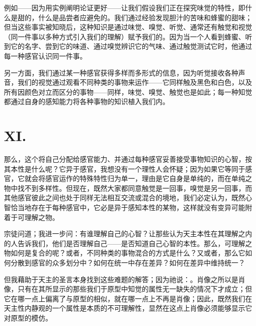 例如——因为用实例阐明论证更好——让我们假设我们正在探究味觉的特性，即什么是甜的，什么是品尝者应避免的。我们通过经验发现胆汁的苦味和蜂蜜的甜味；但当这些事实被知晓后，这种知识是通过味觉、嗅觉、听觉、通常还有触觉和视觉（同一件事以多种方式引入我们的理解）赋予我们的。因为当一个人看到蜂蜜、听到它的名字、尝到它的味道、通过嗅觉辨识它的气味、通过触觉测试它时，他通过每一种感官认识同一件事。\par

另一方面，我们通过某一种感官获得多样而多形式的信息，因为听觉接收各种声音，我们的视觉通过观看不同种类的事物来运作——它同样触及黑色和白色，以及所有因颜色对立而区分的事物——同样，味觉、嗅觉、触觉也是如此；每一种知觉都通过自身的感知能力将各种事物的知识植入我们内。\par


\section{XI. }

那么，这个将自己分配给感官能力、并通过每种感官妥善接受事物知识的心智，按其本性是什么呢？它异于感官，我想没有一个理性人会怀疑；因为如果它等同于感官，它就会将感官运作的特殊特性归为单一，理由是它自身是单纯的，而在单纯之物中找不到多样性。但现在，既然大家都同意触觉是一回事，嗅觉是另一回事，而其他感官彼此之间也处于同样无法相互交流或混合的境地，我们必定认为，既然心智恰当地存在于每种感官中，它必是异于感知本性的某物，这样就没有变异可能附着于可理解之物。\par

宗徒问道；我进一步问：有谁理解自己的心智？让那些认为天主本性在其理解之内的人告诉我们，他们是否理解自己——是否知道自己心智的本性。那么，可理解之物如何是复合的呢？或者，不同种类的事物混合的方式是什么？又或者，那么它如何分散到感官的众多划分中？如何在统一中存在差异？如何在差异中维持统一？\par

但我藉助于天主的圣言本身找到这些难题的解答；因为祂说：。肖像之所以是肖像，只有在其所显示的那些我们于原型中知觉的属性无一缺失的情况下才成立；但它在哪一点上偏离了与原型的相似，就在哪一点上不再是肖像；因此，既然我们在天主性内静观的一个属性是本质的不可理解性，显然在这点上肖像必须能够显示它对原型的模仿。\par

